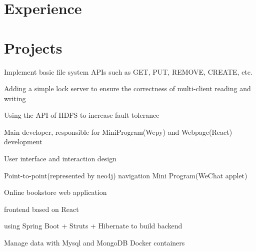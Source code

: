 \documentclass[]{deedy-resume-openfont}
\begin{document}
\begin{minipage}[t]{0.68\textwidth} 


\section{Experience}
\sectionsep


\sectionsep


\section{Projects}
\sectionsep

\vspace{\topsep}
\begin{tightemize}
    \item Implement basic file system APIs such as GET, PUT, REMOVE, CREATE, etc.
    \item Adding a simple lock server to ensure the correctness of multi-client reading and writing
    \item Using the API of HDFS to increase fault tolerance
\end{tightemize}
\sectionsep

\begin{tightemize}
    \item Main developer, responsible for MiniProgram(Wepy) and Webpage(React) development
    \item User interface and interaction design
    \item Point-to-point(represented by neo4j) navigation Mini Program(WeChat applet)
\end{tightemize}
\sectionsep

\begin{tightemize}
    \item Online bookstore web application
    \item frontend based on React 
    \item using Spring Boot + Struts + Hibernate to build backend
    \item Manage data with Mysql and MongoDB Docker containers
\end{tightemize}
\sectionsep


\end{minipage}
\end{document}
